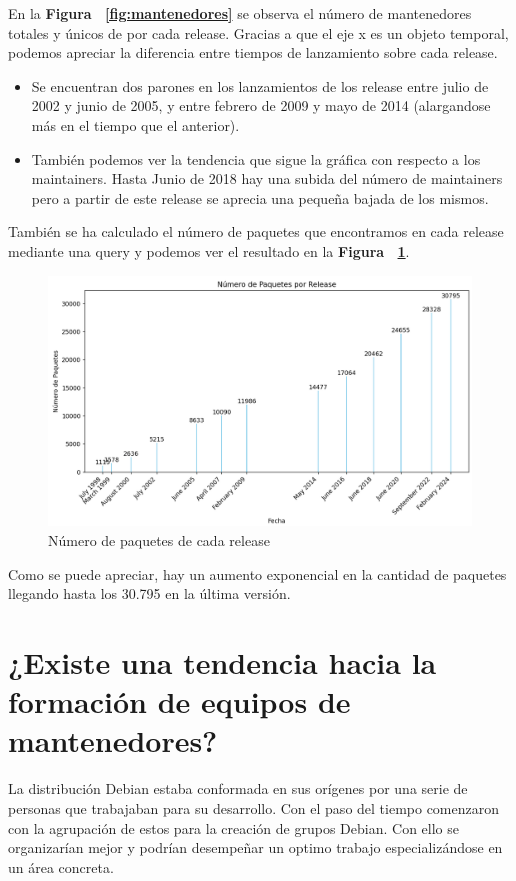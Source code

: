 \documentclass[a4paper, 12pt]{book}
\begin{document}
En la  \textbf{Figura ~\ref{fig:mantenedores}} se observa el número de mantenedores totales y únicos de por cada release. 
Gracias a que el eje x es un objeto temporal, podemos apreciar la diferencia entre tiempos de lanzamiento sobre cada release.
	\begin{itemize}
	\item  Se encuentran dos parones en los lanzamientos de los release entre julio de 2002 y junio de 2005, y entre febrero de 2009 y mayo de 2014 (alargandose más en el tiempo que el anterior).
	
	\item También podemos ver la tendencia que sigue la gráfica con respecto a los maintainers. Hasta Junio de 2018 hay una subida del número de maintainers pero a partir de este release se aprecia una pequeña bajada de los mismos.
\end{itemize}

También se ha calculado el número de paquetes que encontramos en cada release mediante una query y podemos ver el resultado en la \textbf{Figura ~\ref{fig:paquetes}}.

\begin{figure}
	\centering
	\includegraphics[width=15cm, keepaspectratio]{img/paquetes_releases.png}
	\caption{Número de paquetes de cada release}
	\label{fig:paquetes}
\end{figure}

Como se puede apreciar, hay un aumento exponencial en la cantidad de paquetes llegando hasta los 30.795 en la última versión.

\section{¿Existe una tendencia hacia la formación de equipos de mantenedores?}
\label{sec:pregunta_2}
La distribución Debian estaba conformada en sus orígenes por una serie de personas que trabajaban para su desarrollo. Con el paso del tiempo comenzaron con la agrupación de estos para la creación de grupos Debian. Con ello se organizarían mejor y podrían desempeñar un optimo trabajo especializándose en un área concreta.
\end{document}
